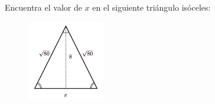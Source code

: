 \question[15] Encuentra el valor de $x$ en el siguiente triángulo isóceles:
\begin{figure}[H]
    \begin{center}
        \includegraphics[width=0.3\textwidth]{../images/pitagoras9.png}
    \end{center}
    \caption{}
    \label{fig:pitagoras9}
\end{figure}